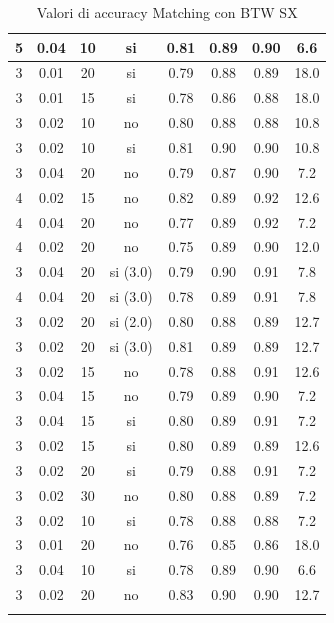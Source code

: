 \documentclass[12pt,a4paper,openright,twoside]{book}
\begin{document}
\begin{longtable}{|c|c|c|c|c|c|c|c|}
    \hline
     5 & 0.04 & 10 & si & 0.81 & 0.89 & 0.90 & 6.6\\
    \hline
     3 & 0.01 & 20 & si & 0.79 & 0.88 & 0.89 & 18.0\\
    \hline
    3 & 0.01 & 15 & si & 0.78 & 0.86 & 0.88 & 18.0\\
    \hline
    3 & 0.02 & 10 & no & 0.80 & 0.88 & 0.88 & 10.8\\
    \hline
    3 & 0.02 & 10 & si & 0.81 & 0.90 & 0.90 & 10.8\\
    \hline
     3 & 0.04 & 20 & no & 0.79 & 0.87 & 0.90 & 7.2\\
    \hline
    4 & 0.02 & 15 & no & 0.82 & 0.89 & 0.92 & 12.6\\
    \hline
    4 & 0.04 & 20 & no & 0.77 & 0.89 & 0.92 & 7.2\\
    \hline
    4 & 0.02 & 20 & no & 0.75 & 0.89 & 0.90 & 12.0\\
    \hline
    3 & 0.04 & 20 & si (3.0) & 0.79 & 0.90 & 0.91 & 7.8\\
    \hline
    4 & 0.04 & 20 & si (3.0) & 0.78 & 0.89 & 0.91 & 7.8\\
   \hline
    3 & 0.02 & 20 & si (2.0) & 0.80 & 0.88 & 0.89 & 12.7\\
   \hline
    3 & 0.02 & 20 & si (3.0) & 0.81 & 0.89 & 0.89 & 12.7\\
   \hline
    3 & 0.02 & 15 & no & 0.78 & 0.88 & 0.91 & 12.6\\
   \hline    
    3 & 0.04 & 15 & no & 0.79 & 0.89 & 0.90 & 7.2\\
    \hline
    3 & 0.04 & 15 & si & 0.80 & 0.89 & 0.91 & 7.2\\
    \hline
    3 & 0.02 & 15 & si & 0.80 & 0.89 & 0.89 & 12.6\\
    \hline
    3 & 0.02 & 20 & si & 0.79 & 0.88 & 0.91 & 7.2\\
    \hline
    3 & 0.02 & 30 & no & 0.80 & 0.88 & 0.89 & 7.2\\
    \hline
    3 & 0.02 & 10 & si & 0.78 & 0.88 & 0.88 & 7.2\\
    \hline
    3 & 0.01 & 20 & no & 0.76 & 0.85 & 0.86 & 18.0\\
    \hline
    3 & 0.04 & 10 & si & 0.78 & 0.89 & 0.90 & 6.6\\
    \hline
    3 & 0.02 & 20 & no & 0.83 & 0.90 & 0.90 & 12.7\\
    \hline

\caption{Valori di accuracy Matching con BTW SX}
\label{tab:accsx}
\end{longtable}
\end{document}
